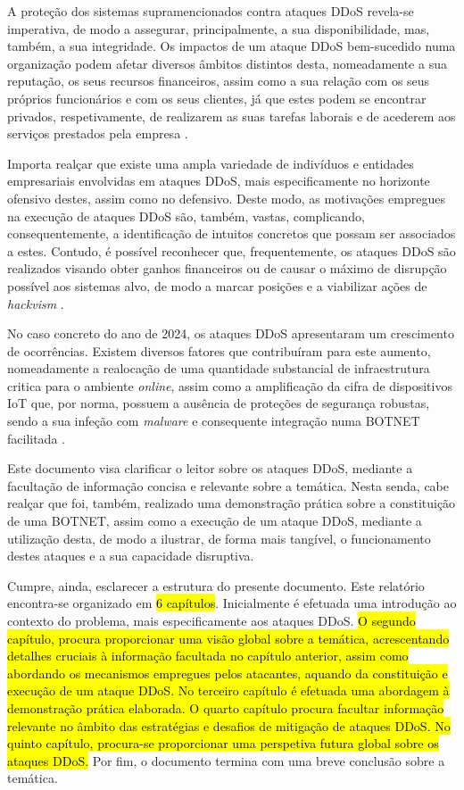 A proteção dos sistemas supramencionados contra ataques DDoS revela-se imperativa, de modo a assegurar, principalmente, a sua disponibilidade, mas, também, a sua integridade. Os impactos de um ataque DDoS bem-sucedido numa organização podem afetar diversos âmbitos distintos desta, nomeadamente a sua reputação, os seus recursos financeiros, assim como a sua relação com os seus próprios funcionários e com os seus clientes, já que estes podem se encontrar privados, respetivamente, de realizarem as suas tarefas laborais e de acederem aos serviços prestados pela empresa \cite{kaspersky_how_ddos_works}.


Importa realçar que existe uma ampla variedade de indivíduos e entidades empresariais envolvidas em ataques DDoS, mais especificamente no horizonte ofensivo destes, assim como no defensivo. Deste modo, as motivações empregues na execução de ataques DDoS são, também, vastas, complicando, consequentemente, a identificação de intuitos concretos que possam ser associados a estes. Contudo, é possível reconhecer que, frequentemente, os ataques DDoS são realizados visando obter ganhos financeiros ou de causar o máximo de disrupção possível aos sistemas alvo, de modo a marcar posições e a viabilizar ações de \textit{hackvism} \cite{fortinet_what_is_ddos}.

No caso concreto do ano de 2024, os ataques DDoS apresentaram um crescimento de ocorrências. Existem diversos fatores que contribuíram para este aumento, nomeadamente a realocação de uma quantidade substancial de infraestrutura critica para o ambiente \textit{online}, assim como a amplificação da cifra de dispositivos IoT que, por norma, possuem a ausência de proteções de segurança robustas, sendo a sua infeção com \textit{malware} e consequente integração numa BOTNET facilitada \cite{arnold_rise_2024}.

Este documento visa clarificar o leitor sobre os ataques DDoS, mediante a facultação de informação concisa e relevante sobre a temática. Nesta senda, cabe realçar que foi, também, realizado uma demonstração prática sobre a constituição de uma BOTNET, assim como a execução de um ataque DDoS, mediante a utilização desta, de modo a ilustrar, de forma mais tangível, o funcionamento destes ataques e a sua capacidade disruptiva.

Cumpre, ainda, esclarecer a estrutura do presente documento. Este relatório encontra-se organizado em \hl{6 capítulos}. Inicialmente é efetuada uma introdução ao contexto do problema, mais especificamente aos ataques DDoS. \hl{O segundo capítulo, procura proporcionar uma visão global sobre a temática, acrescentando detalhes cruciais à informação facultada no capítulo anterior, assim como abordando os mecanismos empregues pelos atacantes, aquando da constituição e execução de um ataque DDoS. No terceiro capítulo é efetuada uma abordagem à demonstração prática elaborada. O quarto capítulo procura facultar informação relevante no âmbito das estratégias e desafios de mitigação de ataques DDoS. No quinto capítulo, procura-se proporcionar uma perspetiva futura global sobre os ataques DDoS.} Por fim, o documento termina com uma breve conclusão sobre a temática.